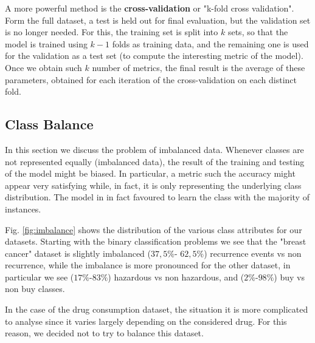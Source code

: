 \documentclass{article}
\begin{document}
A more powerful method is the \textbf{cross-validation} or "k-fold cross validation". Form the full dataset, a test is held out for final evaluation, but the validation set is no longer needed. For this, the training set is split into $k$ sets, so that the model is trained using $k-1$ folds as training data, and the remaining one is used for the validation as a test set (to compute the interesting metric of the model).
Once we obtain such $k$ number of metrics, the final result is the average of these parameters, obtained for each iteration of the cross-validation on each distinct fold.

\subsection{Class Balance}\label{sec:balance}
In this section we discuss the problem of imbalanced data. Whenever classes are not represented equally (imbalanced data), the result of the training and testing of the model might be biased. In particular, a metric such the accuracy might appear very satisfying while, in fact, it is only representing the underlying class distribution. The model in in fact favoured to learn the class with the majority of instances.

Fig. \ref{fig:imbalance} shows the distribution of the various class attributes for our datasets. Starting with the binary classification problems we see that the "breast cancer" dataset is slightly imbalanced
($37,5\%$- $62,5\%$) recurrence events vs non recurrence, while the imbalance is more pronounced for the other dataset, in particular we see
($17\%$-$83\%$) hazardous vs non hazardous, and ($2\%$-$98\%$) buy vs  non buy classes.

In the case of the drug consumption dataset, the situation it is more complicated to analyse since it varies largely depending on the considered drug. For this reason, we decided not to try to balance this dataset.
\end{document}
